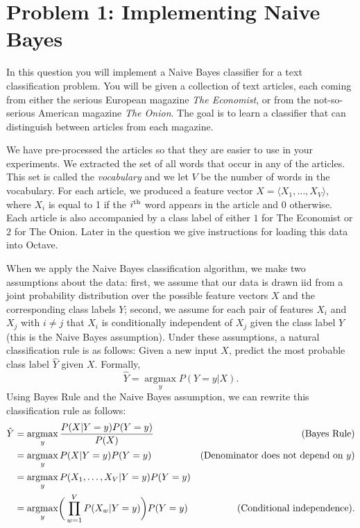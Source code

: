 \documentclass{article}
\newcommand \argmax {\operatorname*{argmax}}
\begin{document}
\section*{Problem 1: Implementing Naive Bayes}

In this question you will implement a Naive Bayes classifier for a
text classification problem. You will be given a collection of text
articles, each coming from either the serious European magazine
\emph{The Economist}, or from the not-so-serious American magazine
\emph{The Onion}. The goal is to learn a classifier that can
distinguish between articles from each magazine.

We have pre-processed the articles so that they are easier to use in
your experiments. We extracted the set of all words that occur in any
of the articles. This set is called the \emph{vocabulary} and we let
$V$ be the number of words in the vocabulary. For each article, we
produced a feature vector $X = \langle X_1, \dots, X_V \rangle$, where
$X_i$ is equal to 1 if the $i^{\rm th}$ word appears in the article
and 0 otherwise.  Each article is also accompanied by a class label of
either $1$ for The Economist or $2$ for The Onion. Later in the
question we give instructions for loading this data into Octave.

When we apply the Naive Bayes classification algorithm, we make two
assumptions about the data: first, we assume that our data is drawn
iid from a joint probability distribution over the possible feature
vectors $X$ and the corresponding class labels $Y$; second, we assume
for each pair of features $X_i$ and $X_j$ with $i \neq j$ that $X_i$
is conditionally independent of $X_j$ given the class label $Y$ (this
is the Naive Bayes assumption). Under these assumptions, a natural
classification rule is as follows: Given a new input $X$, predict the
most probable class label $\hat Y$ given $X$. Formally,
\[
\hat Y = \argmax_y P(Y = y | X).
\]
Using Bayes Rule and the Naive Bayes assumption, we can rewrite this
classification rule as follows:
\begin{align*}
  \hat Y 
  &= \argmax_y \frac{P(X | Y = y)P(Y = y)}{P(X)} & \hbox{(Bayes Rule)}
  \\
  &= \argmax_y P(X | Y = y)P(Y = y) & \hbox{(Denominator does not
                                      depend on $y$)} \\
  &= \argmax_y P(X_1, \dots, X_V | Y = y) P(Y = y) \\
  &= \argmax_y \biggl(\, \prod_{w=1}^V P(X_w | Y = y) \biggr) P(Y=y) 
                                                 & \hbox{(Conditional independence)}.
\end{align*}
\end{document}
